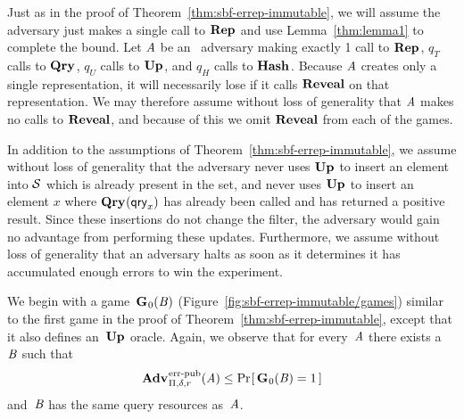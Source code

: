 %
%
Just as in the proof of Theorem~\ref{thm:sbf-errep-immutable}, we will assume
the adversary just makes a single call to $\textup{\textbf{Rep}}\hspace{0.5pt}$ and use Lemma~\ref{thm:lemma1}
to complete the bound. Let $\mathit{A}$ be an \erreps\ adversary making exactly 1
call to $\textup{\textbf{Rep}}\hspace{0.5pt}$, $q_T$ calls to $\textup{\textbf{Qry}}\hspace{0.5pt}$, $q_U$ calls to $\textup{\textbf{Up}}\hspace{0.5pt}$, and $q_H$ calls
to $\textup{\textbf{Hash}}\hspace{0.5pt}$. Because $\mathit{A}$ creates only a single representation, it will
necessarily lose if it calls $\mathbf{Reveal}$ on that representation. We may therefore
assume without loss of generality that $\mathit{A}$ makes no calls to $\mathbf{Reveal}$, and
because of this we omit $\mathbf{Reveal}$ from each of the games.
%

In addition to the assumptions of Theorem~\ref{thm:sbf-errep-immutable}, we
assume without loss of generality that the adversary never uses $\textup{\textbf{Up}}\hspace{0.5pt}$ to insert
an element into $\mathcal{S}$ which is already present in the set, and never uses
$\textup{\textbf{Up}}\hspace{0.5pt}$ to insert an element $x$ where $\textup{\textbf{Qry}}\hspace{0.5pt}(\mathsf{qry}_x)$ has already been called
and has returned a positive result. Since these insertions do not change the
filter, the adversary would gain no advantage from performing these updates.
Furthermore, we assume without loss of generality that an adversary halts as
soon as it determines it has accumulated enough errors to win the experiment.

We begin with a game~$\textup{\textbf{G}}\hspace{0.5pt}_0(\mathit{B})$
(Figure~\ref{fig:sbf-errep-immutable/games}) similar to the first game in the
proof of Theorem~\ref{thm:sbf-errep-immutable}, except that it also defines
an~$\textup{\textbf{Up}}\hspace{0.5pt}$ oracle. Again, we observe that for every~$\mathit{A}$ there exists
a~$\mathit{B}$ such that
\begin{equation}
  \Adv{\errep}_{\Pi,\delta,r}(\advA) \leq \Prob{\game_0(\advB) = 1}
\end{equation}
and~$\mathit{B}$ has the same query resources as~$\mathit{A}$.


